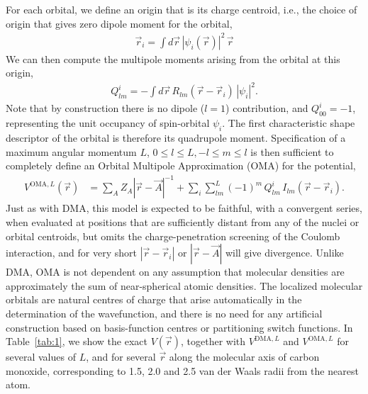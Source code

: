 \documentclass[journal=jacsat,manuscript=article]{achemso}
\begin{document}
For each orbital, we define an origin that is its charge centroid, i.e., the
choice of origin that gives zero dipole moment for the orbital,
\begin{align}
  \vec r_i = \int d \vec r \,|\psi_i(\vec r)|^2 \,  \vec r
\end{align}
We can then compute the multipole moments arising from the orbital at this origin,
\begin{align}
    Q^i_{lm} = -\int d\vec r \, R_{lm}(\vec r-\vec r_i) \, |\psi_i|^2
    .
\end{align}
Note that by construction there is no dipole ($l=1$) contribution, and $Q^i_{00}=-1$, representing the unit occupancy of spin-orbital $\psi_i$. The first characteristic shape descriptor of the orbital is therefore its quadrupole moment.
Specification of a maximum angular momentum $L$, $0\le l\le L, -l\le m\le l$ is then sufficient to completely define an Orbital Multipole Approximation (OMA) for the potential,
\begin{align}
    V^{\text{OMA},L}(\vec r) &=
    \sum_A Z_A |\vec r
    - \vec A|^{-1}
    +\sum_i \sum_{lm}^L(-1)^m\, Q^i_{lm}\, I_{lm}(\vec r - \vec r_i)
    .
\end{align}
Just as with DMA, this model is expected to be faithful, with a convergent series, when evaluated at positions that are sufficiently distant from any of the nuclei or orbital centroids, but omits the
charge-penetration screening of the Coulomb interaction, and for very short $|\vec r-\vec r_i|$ or $|\vec r-\vec A|$ will give divergence. Unlike DMA, OMA is not dependent on any assumption that molecular densities are approximately the sum of near-spherical atomic densities. The localized molecular orbitals are natural centres of charge that arise automatically in the determination of the wavefunction, and there is no need for any artificial construction based
on basis-function centres\cite{Stone1981} or partitioning switch functions\cite{Stone2005DistributedSets.}.
In Table~\ref{tab:1}, we show the exact $V(\vec r)$, together with
$V^{\text{DMA},L}$ and
$V^{\text{OMA},L}$ for several values of $L$, and for several $\vec r$ along the molecular axis of carbon monoxide, corresponding to 1.5, 2.0 and 2.5 van der Waals radii from the nearest atom.
\end{document}

